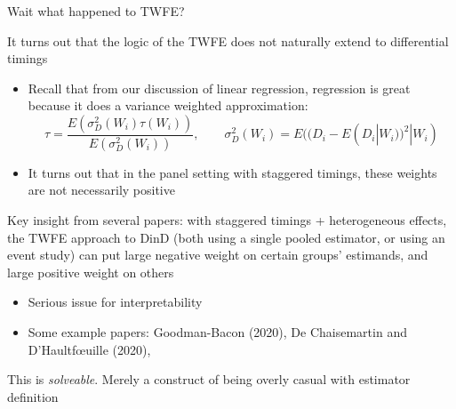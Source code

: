 \documentclass[notes,11pt, aspectratio=169]{beamer}
\newenvironment{wideitemize}{\itemize\addtolength{\itemsep}{10pt}}{\enditemize}
\begin{document}
\begin{frame}{Wait what happened to TWFE?}
  \begin{wideitemize}
  \item It turns out that the logic of the TWFE does not naturally extend to differential timings
    \begin{itemize}
    \item Recall that from our discussion of linear regression, regression is great because it does a variance weighted approximation:
      \begin{equation*}
        \tau = \frac{E(\sigma^{2}_{D}(W_{i})\tau(W_{i}))}{E(\sigma^{2}_{D}(W_{i}))}, \qquad \sigma^{2}_{D}(W_{i}) = E((D_{i} - E(D_{i}|W_{i}))^{2} | W_{i})
      \end{equation*}
  \item It turns out that in the panel setting with staggered timings,
    these weights are not necessarily positive
  \end{itemize}
\item Key insight from several papers: with staggered timings +
    heterogeneous effects, the TWFE approach to DinD (both using a
    single pooled estimator, or using an event study) can put large
    negative weight on certain groups' estimands, and large positive
    weight on others
    \begin{itemize}
    \item Serious issue for interpretability
    \item Some example papers: Goodman-Bacon (2020), De Chaisemartin
      and D’Haultfœuille (2020),
    \end{itemize}
  \item This is \emph{solveable}. Merely a construct of being overly
    casual with estimator definition
  \end{wideitemize}
\end{frame}
\end{document}
